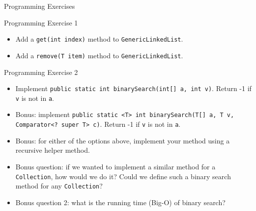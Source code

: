 \documentclass{beamer}
\begin{document}
\begin{frame}[fragile]{Programming Exercises}

Programming Exercise 1
\begin{itemize}
\item Add a {\tt get(int index)} method to {\tt GenericLinkedList}.
\item Add a {\tt remove(T item)} method to {\tt GenericLinkedList}.
\end{itemize}
Programming Exercise 2
\begin{itemize}
\item Implement {\tt public static int binarySearch(int[] a, int v)}.  Return -1 if {\tt v} is not in {\tt a}.
\item Bonus: implement {\tt public static <T> int binarySearch(T[] a, T v, Comparator<? super T> c)}. Return -1 if {\tt v} is not in {\tt a}.
\item Bonus: for either of the options above, implement your method using a recursive helper method.
\item Bonus question: if we wanted to implement a similar method for a {\tt Collection}, how would we do it?  Could we define such a binary search method for any {\tt Collection}?
\item Bonus question 2: what is the running time (Big-O) of binary search?
\end{itemize}


\end{frame}







\end{document}
